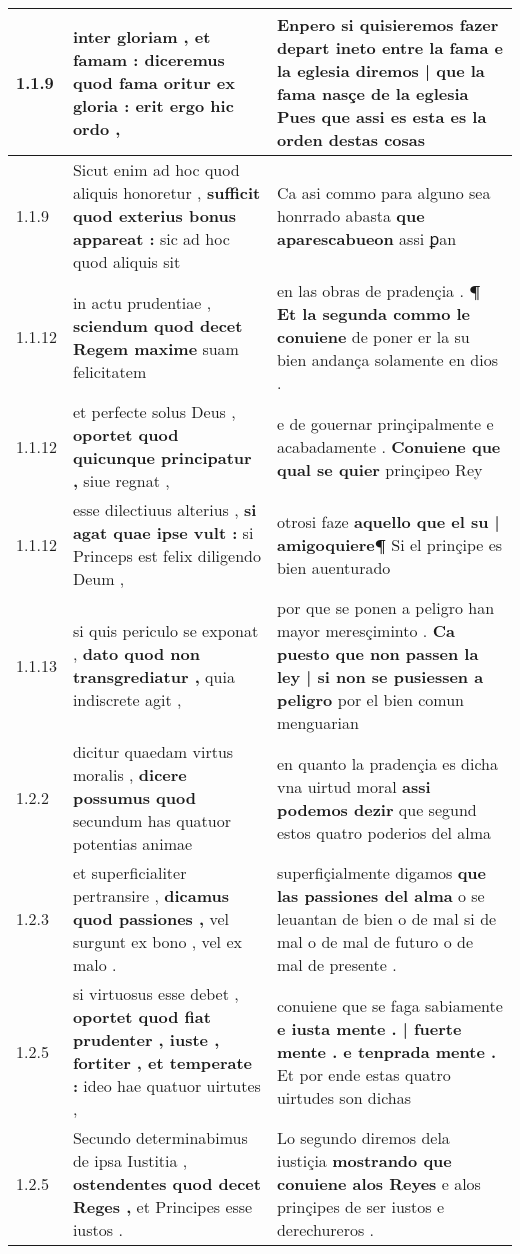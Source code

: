 \begin{tabular}{|p{1cm}|p{6.5cm}|p{6.5cm}|}
1.1.9 & inter gloriam , et famam : \textbf{ diceremus quod fama oritur ex gloria : } erit ergo hic ordo , & Enpero si quisieremos fazer depart ineto entre la fama e la eglesia \textbf{ diremos | que la fama nasçe de la eglesia } Pues que assi es esta es la orden destas cosas \\\hline
1.1.9 & Sicut enim ad hoc quod aliquis honoretur , \textbf{ sufficit quod exterius bonus appareat : } sic ad hoc quod aliquis sit & Ca asi commo para alguno sea honrrado abasta \textbf{ que aparescabueon } assi ꝑan \\\hline
1.1.12 & in actu prudentiae , \textbf{ sciendum quod decet Regem maxime } suam felicitatem & en las obras de pradençia . \textbf{ ¶ Et la segunda commo le conuiene } de poner er la su bien andança solamente en dios . \\\hline
1.1.12 & et perfecte solus Deus , \textbf{ oportet quod quicunque principatur , } siue regnat , & e de gouernar prinçipalmente e acabadamente . \textbf{ Conuiene que qual se quier } prinçipeo Rey \\\hline
1.1.12 & esse dilectiuus alterius , \textbf{ si agat quae ipse vult : } si Princeps est felix diligendo Deum , & otrosi faze \textbf{ aquello que el su | amigoquiere¶ } Si el prinçipe es bien auenturado \\\hline
1.1.13 & si quis periculo se exponat , \textbf{ dato quod non transgrediatur , } quia indiscrete agit , & por que se ponen a peligro han mayor meresçiminto . \textbf{ Ca puesto que non passen la ley | si non se pusiessen a peligro } por el bien comun menguarian \\\hline
1.2.2 & dicitur quaedam virtus moralis , \textbf{ dicere possumus quod } secundum has quatuor potentias animae & en quanto la pradençia es dicha vna uirtud moral \textbf{ assi podemos dezir } que segund estos quatro poderios del alma \\\hline
1.2.3 & et superficialiter pertransire , \textbf{ dicamus quod passiones , } vel surgunt ex bono , vel ex malo . & superfiçialmente digamos \textbf{ que las passiones del alma } o se leuantan de bien o de mal si de mal o de mal de futuro o de mal de presente . \\\hline
1.2.5 & si virtuosus esse debet , \textbf{ oportet quod fiat prudenter , iuste , fortiter , et temperate : } ideo hae quatuor uirtutes , & conuiene que se faga sabiamente \textbf{ e iusta mente . | fuerte mente . e tenprada mente . } Et por ende estas quatro uirtudes son dichas \\\hline
1.2.5 & Secundo determinabimus de ipsa Iustitia , \textbf{ ostendentes quod decet Reges , } et Principes esse iustos . & Lo segundo diremos dela iustiçia \textbf{ mostrando que conuiene alos Reyes } e alos prinçipes de ser iustos e derechureros . \\\hline

\end{tabular}
